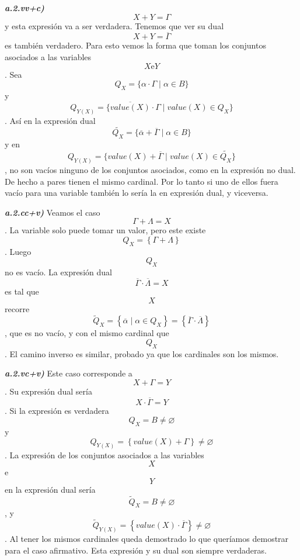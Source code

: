 \begin{enumerate}
\begin{enumerate}
\begin{enumerate}
\begin{enumerate}
\begin{enumerate}
          \emph{\textbf{a.2.vv+c)}} \[{X + Y} = \Gamma\]y esta expresión
          va a ser verdadera. Tenemos que ver su dual
          \[{X + Y} = \overline{\Gamma}\]es también verdadero. Para esto
          vemos la forma que to\-man los conjuntos asociados a las
          variables \[X\text{e}Y\]. Sea
          \[Q_{X} = {\{{{\alpha \cdot \Gamma} \mid {\alpha \in B}}\}}\]
          y
          \[Q_{Y{(X)}} = {\{{{\overline{\mathit{value}{(X)}} \cdot \Gamma} \mid \mathit{value}{{(X)} \in Q_{X}}}\}}\].
          Así en la expresión dual
          \[\widetilde{Q_{X}} = {\{{{\overline{\alpha} + \overline{\Gamma}} \mid {\alpha \in B}}\}}\]
          y en
          \[Q_{Y{(X)}} = {\{{{{\mathit{value}{(X)}} + \overline{\Gamma}} \mid \mathit{value}{{(X)} \in \widetilde{Q_{X}}}}\}}\],
          no son vacíos ninguno de los con\-juntos asociados, como en la
          expresión no dual. De hecho a pares tienen el mismo cardinal.
          Por lo tanto si uno de ellos fuera vacío para una variable
          también lo sería la en expresión dual, y viceversa.

          \emph{\textbf{a.2.cc+v)}} Veamos el caso
          \[{\Gamma + \Lambda} = X\]. La variable solo puede tomar un
          va\-lor, pero este existe
          \[Q_{X} = \left\{ {\Gamma + \Lambda} \right\}\]. Luego
          \[Q_{X}\]no es vacío. La expresión dual
          \[{\overline{\Gamma} \cdot \overline{\Lambda}} = X\]es tal que
          \[X\]recorre
          \[{{\widetilde{Q}}_{X} = \left\{ {\overline{\alpha} \mid {\alpha \in Q_{X}}} \right\}} = \left\{ {\overline{\Gamma} \cdot \overline{\Lambda}} \right\}\],
          que es no vacío, y con el mismo cardinal que \[Q_{X}\]. El
          camino inverso es similar, probado ya que los cardinales son
          los mismos.

          \emph{\textbf{a.2.vc+v)}} Este caso corresponde a
          \[{X + \Gamma} = Y\]. Su expresión dual sería
          \[{X \cdot \overline{\Gamma}} = Y\]. Si la expresión es
          verdadera \[{Q_{X} = B} \neq \varnothing\]y
          \[{Q_{Y{(X)}} = \left\{ {\mathit{value}{{(X)} + \Gamma}} \right\}} \neq \varnothing\].
          La expresión de los conjuntos asociados a las variables \[X\]
          e \[Y\] en la expresión dual sería
          \[{{\widetilde{Q}}_{X} = B} \neq \varnothing\], y
          \[{{\widetilde{Q}}_{Y{(X)}} = \left\{ {{\mathit{value}{(X)}} \cdot \overline{\Gamma}} \right\}} \neq \varnothing\].
          Al tener los mismos cardinales queda demos\-trado lo que
          queríamos demostrar para el caso afirmativo. Esta expresión y
          su dual son siempre verdaderas.


\end{enumerate}
\end{enumerate}
\end{enumerate}
\end{enumerate}
\end{enumerate}
